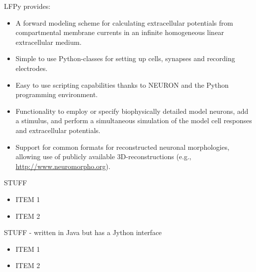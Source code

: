 \begin{multicols}{3}
LFPy provides:
\begin{itemize}[nolistsep, topsep=0em, leftmargin=1pc]
\item A forward modeling scheme for calculating extracellular potentials from compartmental membrane currents in an infinite homogeneous linear extracellular medium.
\item Simple to use Python-classes for setting up cells, synapses and recording electrodes.
\item Easy to use scripting capabilities thanks to NEURON and the Python programming environment.
\item Functionality to employ or specify biophysically detailed model neurons, add a stimulus, and perform a simultaneous simulation of the model cell responses and extracellular potentials.
\item Support for common formats for reconstructed neuronal morphologies, allowing use of publicly available 3D-reconstructions (e.g., \url{http://www.neuromorpho.org}). 
\end{itemize}


%


STUFF

\begin{itemize}[nolistsep,topsep=0em,leftmargin=1pc]
\item ITEM 1
\item ITEM 2
\end{itemize}


STUFF - written in Java but has a Jython interface

\begin{itemize}[nolistsep,topsep=0em,leftmargin=1pc]
\item ITEM 1
\item ITEM 2
\end{itemize}


%



\end{multicols}
